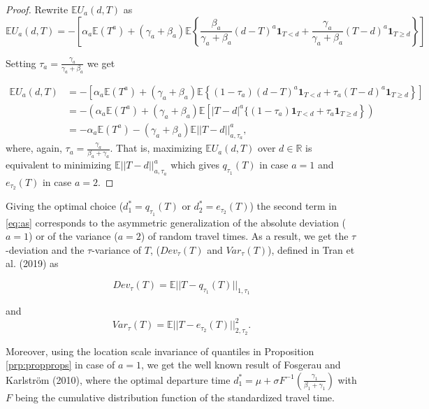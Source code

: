 \documentclass[
]{article}
\theoremstyle{definition}
\theoremstyle{definition}
\theoremstyle{definition}
\theoremstyle{definition}
\theoremstyle{remark}
\begin{document}
\begin{proof}
Rewrite \(\mathbb EU_a(d,T)\) as
\[\mathbb EU_a(d,T) = -\left[\alpha_a \mathbb E(T^a) + (\gamma_a+\beta_a)\mathbb E\left\{\frac{\beta_a}{\gamma_a+\beta_a}(d-T)^a\mathbf 1_{T<d}+ \frac{\gamma_a}{\gamma_a+\beta_a}(T-d)^a\mathbf 1_{T\geq d}\right\}\right]\]

Setting \(\tau_a=\frac{\gamma_a}{\gamma_a+\beta_a}\) we get

\begin{align}
\mathbb EU_a(d,T) &= -\left[\alpha_a \mathbb E(T^a) + (\gamma_a+\beta_a)\mathbb E\left\{(1-\tau_a)(d-T)^a\mathbf 1_{T<d}+ \tau_a(T-d)^a\mathbf 1_{T\geq d}\right\}\right]\nonumber\\
&= -\left(\alpha_a \mathbb E(T^a) + (\gamma_a+\beta_a)\mathbb E\left[|T-d|^a\{(1-\tau_a)\mathbf 1_{T<d}+ \tau_a\mathbf 1_{T\geq d}\right\}\right)\nonumber\\
&= -\alpha_a \mathbb E(T^a) - (\gamma_a+\beta_a)\mathbb E||T-d||_{a,\tau_a}^a, \label{eq:as}
\end{align}
where, again, \(\tau_a = \frac{\gamma_a}{\beta_a+\gamma_a}\). That is, maximizing \(\mathbb EU_a(d,T)\) over \(d\in\mathbb R\) is equivalent to minimizing \(\mathbb E||T-d||_{a,\tau_a}^a\) which gives \(q_{\tau_1}(T)\) in case \(a=1\) and \(e_{\tau_2}(T)\) in case \(a=2\).
\end{proof}

Giving the optimal choice (\(d_1^*= q_{\tau_1}(T)\) or \(d_2^*= e_{\tau_2}(T)\)) the second term in \eqref{eq:as} corresponds to the asymmetric generalization of the absolute deviation (\(a=1\)) or of the variance (\(a=2\)) of random travel times. As a result, we get the \(\tau\)-deviation and the \(\tau\)-variance of \(T\), (\(Dev_\tau(T)\) and \(Var_\tau(T)\)), defined in Tran et al. (2019) as

\begin{equation}
Dev_\tau(T) = \mathbb E ||T-q_{\tau_1}(T)||_{1,\tau_1} \label{eq:tdev}
\end{equation}

and
\begin{equation}
Var_\tau(T) = \mathbb E ||T-e_{\tau_2}(T)||^2_{2,\tau_2}. \label{eq:tvar}
\end{equation}

Moreover, using the location scale invariance of quantiles in Proposition \ref{prp:propprops} in case of \(a=1\), we get the well known result of Fosgerau and Karlström (2010), where the optimal departure time \(d_1^* = \mu + \sigma F^{-1}\left(\frac{\gamma_1}{\beta_1+\gamma_1}\right)\) with \(F\) being the cumulative distribution function of the standardized travel time.
\end{document}

